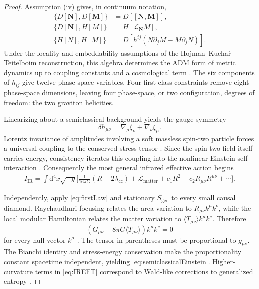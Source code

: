\documentclass[11pt]{article}
\theoremstyle{remark}
\newcommand{\dd}{\mathrm d}
\begin{document}
\begin{proof}
Assumption (iv) gives, in continuum notation,
\begin{align}
 \{D[\bm N],D[\bm M]\}
   &=D[[\bm N,\bm M]],\\
 \{D[\bm N],H[M]\}
   &=H[\mathcal L_{\bm N}M],\\
 \{H[N],H[M]\}
   &=D[h^{ij}(N\partial_jM-M\partial_jN)].
 \label{eq:HDA}
\end{align}
Under the locality and embeddability assumptions of the
Hojman--Kucha\v{r}--Teitelboim reconstruction, this algebra determines the
ADM form of metric dynamics up to coupling constants and a cosmological
term \cite{HKT1976}.  The six components of \(h_{ij}\) give twelve
phase-space variables.  Four first-class constraints remove eight
phase-space dimensions, leaving four phase-space, or two configuration,
degrees of freedom: the two graviton helicities.

Linearizing about a semiclassical background yields the gauge symmetry
\begin{equation}
  \delta h_{\mu\nu}
  =\nabla_\mu\xi_\nu+\nabla_\nu\xi_\mu.
\end{equation}
Lorentz invariance of amplitudes involving a soft massless spin-two
particle forces a universal coupling to the conserved stress tensor
\cite{Weinberg1964}.  Since the spin-two field itself carries energy,
consistency iterates this coupling into the nonlinear Einstein
self-interaction \cite{Deser1970}.  Consequently the most general
infrared effective action begins
\begin{equation}
\begin{split}
 I_{\mathrm{IR}}
 =
 \int\dd^4x\sqrt{-g}\Big[
   \frac{1}{16\pi G}(R-2\lambda_{\mathrm{cc}})
   +\mathcal L_{\mathrm{matter}}
   +c_1R^2+c_2R_{\mu\nu}R^{\mu\nu}
   +\cdots
 \Big].
 \label{eq:IREFT}
\end{split}
\end{equation}

Independently, apply \eqref{eq:firstLaw} and stationary
\(S_{\mathrm{gen}}\) to every small causal diamond.  Raychaudhuri
focusing relates the area variation to
\(R_{\mu\nu}k^\mu k^\nu\), while the local modular Hamiltonian relates
the matter variation to
\(\langle T_{\mu\nu}\rangle k^\mu k^\nu\).  Therefore
\begin{equation}
  \left(
    G_{\mu\nu}
    -8\pi G\langle T_{\mu\nu}\rangle
  \right)k^\mu k^\nu=0
  \label{eq:nullEquation}
\end{equation}
for every null vector \(k^\mu\) \cite{Jacobson1995,Jacobson2015}.
The tensor in parentheses must be proportional to \(g_{\mu\nu}\).
The Bianchi identity and stress-energy conservation make the
proportionality constant spacetime independent, yielding
\eqref{eq:semiclassicalEinstein}.  Higher-curvature terms in
\eqref{eq:IREFT} correspond to Wald-like corrections to generalized
entropy \cite{Wald1993,Bueno2017}.
\end{proof}
\end{document}
